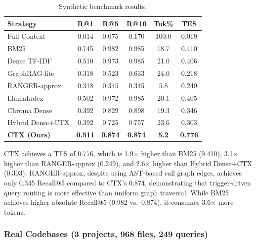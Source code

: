 \documentclass[11pt]{article}
\begin{document}
\begin{table}[t]
\centering
\small
\caption{Synthetic benchmark results.}
\label{tab:synthetic}
\begin{tabular}{@{}lccccc@{}}
\toprule
\textbf{Strategy} & \textbf{R@1} & \textbf{R@5} & \textbf{R@10} & \textbf{Tok\%} & \textbf{TES} \\
\midrule
Full Context & 0.014 & 0.075 & 0.170 & 100.0 & 0.019 \\
BM25 & 0.745 & 0.982 & 0.985 & 18.7 & 0.410 \\
Dense TF-IDF & 0.510 & 0.973 & 0.985 & 21.0 & 0.406 \\
GraphRAG-lite & 0.318 & 0.523 & 0.633 & 24.0 & 0.218 \\
RANGER-approx & 0.318 & 0.345 & 0.345 & 5.8 & 0.249 \\
LlamaIndex & 0.502 & 0.972 & 0.985 & 20.1 & 0.405 \\
Chroma Dense & 0.392 & 0.829 & 0.898 & 19.3 & 0.346 \\
Hybrid Dense+CTX & 0.392 & 0.725 & 0.757 & 23.6 & 0.303 \\
\textbf{CTX (Ours)} & \textbf{0.511} & \textbf{0.874} & \textbf{0.874} & \textbf{5.2} & \textbf{0.776} \\
\bottomrule
\end{tabular}
\end{table}

CTX achieves a TES of 0.776, which is 1.9$\times$ higher than BM25 (0.410), 3.1$\times$ higher than RANGER-approx (0.249), and 2.6$\times$ higher than Hybrid Dense+CTX (0.303). RANGER-approx, despite using AST-based call graph edges, achieves only 0.345 Recall@5 compared to CTX's 0.874, demonstrating that trigger-driven query routing is more effective than uniform graph traversal. While BM25 achieves higher absolute Recall@5 (0.982 vs.\ 0.874), it consumes 3.6$\times$ more tokens.

\subsubsection{Real Codebases (3 projects, 968 files, 249 queries)}
\end{document}

